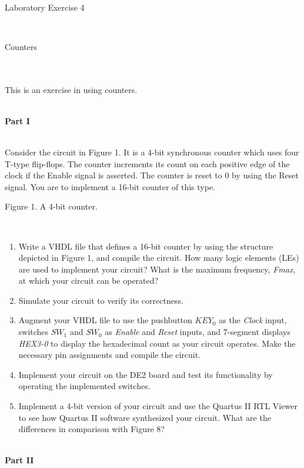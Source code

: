 \documentclass[psfig,10pt,fullpage]{article}
\begin{document}
~\\
\centerline{\huge Laboratory Exercise 4}
~\\
\centerline{\large Counters}
~\\
~\\

This is an exercise in using counters.

~\\
\noindent
{\bf Part I}

~\\
\noindent
Consider the circuit in Figure 1. It is a 4-bit synchronous counter which uses four
T-type flip-flops. The counter increments its count on each positive edge of the clock
if the Enable signal is asserted. The counter is reset to 0 by using the Reset signal.
You are to implement a 16-bit counter of this type.
~\\

\begin{figure}[H]
\scriptsize
\centerline{
\hbox{}}
\end{figure}
\centerline{Figure 1.  A 4-bit counter.}
~\\

\begin{enumerate}
\item Write a VHDL file that defines a 16-bit counter by using the structure
depicted in Figure 1, and compile the circuit. How many logic elements (LEs) are 
used to implement your circuit? What is the maximum frequency, {\it Fmax}, at which
your circuit can be operated?
\item Simulate your circuit to verify its correctness.
\item Augment your VHDL file to use the pushbutton $KEY_0$ as the {\it Clock}
input, switches $SW_1$ and $SW_0$ as {\it Enable} and {\it Reset} inputs, and
7-segment displays {\it HEX3-0} to display the hexadecimal count as your circuit
operates. Make the necessary pin assignments and compile the circuit.
\item Implement your circuit on the DE2 board and test its functionality by operating
the implemented switches.
\item Implement a 4-bit version of your circuit and use the Quartus II RTL Viewer to
see how Quartus II software synthesized your circuit. What are the differences in
comparison with Figure 8?
\end{enumerate}

~\\
\noindent
{\bf Part II}
\end{document}
